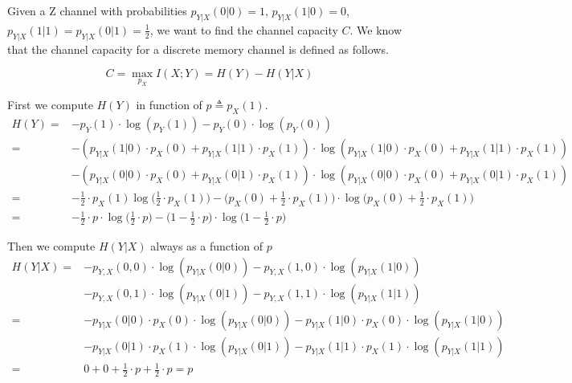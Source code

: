 
Given a Z channel with probabilities $p_{Y|X}(0|0)=1$, $p_{Y|X}(1|0)=0$, $p_{Y|X}(1|1)=p_{Y|X}(0|1)=\frac{1}{2}$, we want to find the channel capacity $C$. We know that the channel capacity for a discrete memory channel is defined as follows.

\begin{equation}
	C = \max_{p_X} I(X;Y) = H(Y)-H(Y|X)
\end{equation}

First we compute $H(Y)$ in function of $p \triangleq p_X(1)$.
%
\begin{equation}
\begin{aligned}
	H(Y)= & -p_Y(1)\cdot\log(p_Y(1))-p_Y(0)\cdot\log(p_Y(0)) \\
	= & -(p_{Y|X}(1|0) \cdot p_X(0) + p_{Y|X}(1|1) \cdot p_X(1)) \cdot\log(p_{Y|X}(1|0) \cdot p_X(0) + p_{Y|X}(1|1) \cdot p_X(1)) \\ & -(p_{Y|X}(0|0) \cdot p_X(0) + p_{Y|X}(0|1) \cdot p_X(1)) \cdot\log(p_{Y|X}(0|0) \cdot p_X(0) + p_{Y|X}(0|1) \cdot p_X(1)) \\
	= & -\frac{1}{2}\cdot p_X(1)\log\Big(\frac{1}{2}\cdot p_X(1)\Big)-\Big(p_X(0)+\frac{1}{2}\cdot p_X(1)\Big)\cdot \log \Big(p_X(0)+\frac{1}{2}\cdot p_X(1)\Big) \\
	= & -\frac{1}{2}\cdot p \cdot \log\Big(\frac{1}{2}\cdot p\Big)-\Big(1-\frac{1}{2}\cdot p\Big)\cdot \log \Big(1-\frac{1}{2}\cdot p\Big)
\end{aligned}
\end{equation}

Then we compute $H(Y|X)$ always as a function of $p$
%
\begin{equation}
\begin{aligned}
	H(Y|X) = & -p_{Y,X}(0,0) \cdot \log (p_{Y|X}(0|0)) -p_{Y,X}(1,0) \cdot \log (p_{Y|X}(1|0)) \\
	& -p_{Y,X}(0,1) \cdot \log (p_{Y|X}(0|1)) -p_{Y,X}(1,1) \cdot \log (p_{Y|X}(1|1)) \\ =
	& -p_{Y|X}(0|0) \cdot p_X(0) \cdot \log (p_{Y|X}(0|0)) -p_{Y|X}(1|0) \cdot p_X(0) \cdot \log (p_{Y|X}(1|0)) \\
	& -p_{Y|X}(0|1) \cdot p_X(1) \cdot \log (p_{Y|X}(0|1)) -p_{Y|X}(1|1) \cdot p_X(1) \cdot \log (p_{Y|X}(1|1)) \\ =	& 0 + 0 + \frac{1}{2} \cdot p + \frac{1}{2} \cdot p = p
\end{aligned}
\end{equation}


